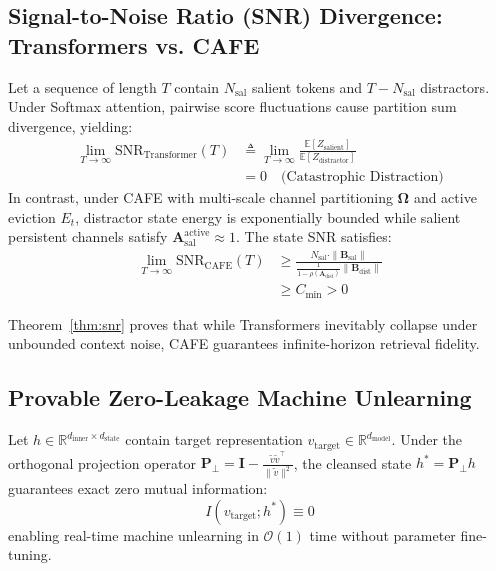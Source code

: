 \subsection{Signal-to-Noise Ratio (SNR) Divergence: Transformers vs. CAFE}
\begin{theorem}
\label{thm:snr}
Let a sequence of length $T$ contain $N_{\mathrm{sal}}$ salient tokens and $T - N_{\mathrm{sal}}$ distractors. Under Softmax attention, pairwise score fluctuations cause partition sum divergence, yielding:
\begin{equation}
\begin{split}
    \lim_{T \rightarrow \infty} \mathrm{SNR}_{\mathrm{Transformer}}(T) &\triangleq \lim_{T \rightarrow \infty} \frac{\mathbb{E}[Z_{\mathrm{salient}}]}{\mathbb{E}[Z_{\mathrm{distractor}}]} \\
    &= 0 \quad \text{(Catastrophic Distraction)}
\end{split}
\end{equation}
In contrast, under CAFE with multi-scale channel partitioning $\boldsymbol{\Omega}$ and active eviction $E_t$, distractor state energy is exponentially bounded while salient persistent channels satisfy $\mathbf{A}_{\mathrm{sal}}^{\mathrm{active}} \approx 1$. The state SNR satisfies:
\begin{equation}
\begin{split}
    \lim_{T \rightarrow \infty} \mathrm{SNR}_{\mathrm{CAFE}}(T) &\ge \frac{N_{\mathrm{sal}} \cdot \|\mathbf{B}_{\mathrm{sal}}\|}{\frac{1}{1 - \rho(\mathbf{A}_{\mathrm{dist}})} \|\mathbf{B}_{\mathrm{dist}}\|} \\
    &\ge C_{\mathrm{min}} > 0
\end{split}
\end{equation}
\end{theorem}
Theorem~\ref{thm:snr} proves that while Transformers inevitably collapse under unbounded context noise, CAFE guarantees infinite-horizon retrieval fidelity.

\subsection{Provable Zero-Leakage Machine Unlearning}
\begin{theorem}
\label{thm:unlearning}
Let $h \in \mathbb{R}^{d_{\mathrm{inner}} \times d_{\mathrm{state}}}$ contain target representation $v_{\mathrm{target}} \in \mathbb{R}^{d_{\mathrm{model}}}$. Under the orthogonal projection operator $\mathbf{P}_{\perp} = \mathbf{I} - \frac{\tilde{v} \tilde{v}^\top}{\|\tilde{v}\|^2}$, the cleansed state $h^* = \mathbf{P}_{\perp} h$ guarantees exact zero mutual information:
\begin{equation}
    I(v_{\mathrm{target}}; h^*) \equiv 0
\end{equation}
enabling real-time machine unlearning in $\mathcal{O}(1)$ time without parameter fine-tuning.
\end{theorem}
